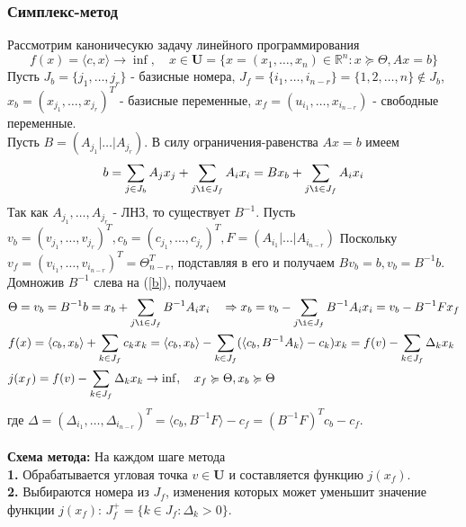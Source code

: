 \documentclass[A4]{article}
\begin{document}
\subsubsection{Симплекс-метод}
Рассмотрим каноничесукю задачу линейного программирования
\begin{equation*}
f(x)=\langle c,x \rangle\rightarrow\inf,\quad x\in\mathbf{U}=\{x=(x_1,\ldots,x_n)\in \mathbb{R}^{n}:x\succcurlyeq\Theta,Ax=b \}
\end{equation*}
Пусть $J_b=\{j_1,\ldots,j_r \}$ - базисные номера, $J_f=\{ i_1,\ldots,i_{n-r}\}=\{1,2,\ldots,n \}\notin J_b$, $x_b=(x_{j_1},\ldots,x_{j_r})^T$ - базисные переменные, $x_f=(u_{i_1},\ldots,x_{i_{n-r}})$ - свободные переменные.\\
Пусть $B=(A_{j_1}|\ldots|A_{j_r})$. В силу ограничения-равенства $Ax=b$ имеем
\begin{equation}
\label{b}
b=\sum_{j\in J_b}A_{j}x_j+\sum_{j\i\in J_f}A_ix_i=Bx_b+\sum_{j\i\in J_f}A_ix_i
\end{equation}
Так как $A_{j_1},\ldots,A_{j_r}$ - ЛНЗ, то существует $B^{-1}$. Пусть $v_b=(v_{j_1},\ldots,v_{j_r})^T,c_b=(c_{j_1},\ldots,c_{j_r})^T,F=(A_{i_1}|\ldots|A_{i_{n-r}})$ Поскольку $v_f=(v_{i_1},\ldots,v_{i_{n-r}})^T=\Theta_{n-r}^T$, подставляя в его и получаем $Bv_b=b,v_b=B^{-1}b$. Домножив $B^{-1}$ слева на (\ref{b}), получаем 
\begin{equation*}
\begin{aligned}
&\Theta=v_b=B^{-1}b=x_b+\sum_{j\i\in J_f}B^{-1}A_ix_i\quad\Rightarrow x_b=v_b-\sum_{j\i\in J_f}B^{-1}A_ix_i=v_b-B^{-1}Fx_f\\
&f(x)=\langle c_b,x_b\rangle+\sum_{k\in J_f}c_kx_k=\langle c_b,x_b\rangle-\sum_{k\in J_f}(\langle c_b,B^{-1}A_k\rangle-c_k)x_k=f(v)-\sum_{k\in J_f}\Delta_kx_k\\
&j(x_f)=f(v)-\sum_{k\in J_f}\Delta_kx_k\rightarrow\inf,\quad x_f\succcurlyeq\Theta,x_b\succcurlyeq\Theta
\end{aligned}
\end{equation*}
где $\Delta=(\Delta_{i_1},\ldots,\Delta_{i_{n-r}})^T=\langle c_b,B^{-1}F\rangle-c_f=(B^{-1}F)^Tc_b-c_f$.\\
\\
\textbf{Схема метода:} На каждом шаге метода\\
\textbf{1.} Обрабатывается угловая точка $v\in\mathbf{U}$ и составляется функцию $j(x_f)$.\\
\textbf{2.} Выбираются номера из $J_f$, изменения которых может уменьшит значение функции $j(x_f)$: $J_f^+=\{k\in J_f: \Delta_k>0 \}$.\\
\end{document}
